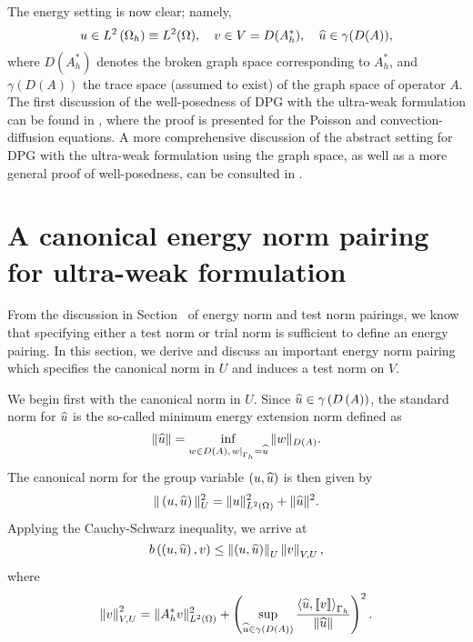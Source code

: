 The energy setting is now clear; namely,
\[
u\in L^2\LRp{\Oh} \equiv L^2(\Omega), \quad v\in V=D(A^*_h), \quad
\widehat{u}\in \gamma(D(A)),
\]
where $D(A_h^*)$ denotes the broken graph space corresponding to $A_h^*$,
and $\gamma(D(A))$ the trace space (assumed to exist) of the graph space of
operator $A$. The first discussion of the well-posedness of DPG with the ultra-weak formulation can be found in \cite{analysisDPG}, where the proof is presented for the Poisson and convection-diffusion equations. A more comprehensive discussion of the abstract setting for DPG with the ultra-weak formulation using the graph space, as well as a more general proof of well-posedness, can be consulted in \cite{Bui-ThanhDemkowiczGhattas11b}. 

\section{A canonical energy norm pairing for ultra-weak formulation}

From the discussion in Section~ of energy norm and test norm pairings, we know that specifying either a test norm or trial norm is sufficient to define an energy pairing. %
In this section, we derive and discuss an important energy norm pairing which specifies the canonical norm in $U$ and induces a test norm on $V$. %

We begin first with the canonical norm in $U$. Since $\uh \in \gamma\LRp{D\LRp{A}}$, the standard norm for $\uh$ is
the so-called minimum energy extension norm defined as
\begin{equation}
\eqnlab{MEnorm}
\|\widehat{u}\| = \inf_{w\in D\LRp{A},
  \left.w\right|_{\Gh}=\widehat{u}} \|w\|_{D\LRp{A}}.
\end{equation}
The canonical norm for the group variable $\LRp{u,\uh}$ is then given by
\[
\|\left(u,\widehat{u}\right)\|_U^2 = \|u\|^2_{\L} + \|\widehat{u}\|^2.
\]
Applying the Cauchy-Schwarz inequality, we arrive at
\[
b\LRp{\LRp{u,\uh},v} \le \nor{\LRp{u,\uh}}_U \nor{v}_{V,U},
\]
where
\[
\nor{v}_{V,U}^2 = \|A_h^*v\|_{\L}^2
+\left(\sup_{\widehat{u} \in \gamma\LRp{D\LRp{A}}} \frac{\LRa{ \widehat{u},
  \jump{v} }_{\Gh}}{\|\widehat{u}\|}\right)^2.
\]

